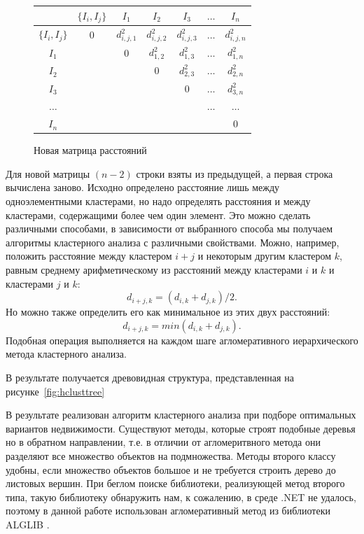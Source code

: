 \documentclass[a4paper,14pt,openany,final]{extreport} %
\def\oldcaption{} \let\oldcaption=\caption
\def\caption{\stepcounter{captionsnum}\oldcaption}
\begin{document}
\begin{figure}[htbp]
  \centering
  \begin{tabular}{|c||c|c|c|c|c|c|}
    \hline
                  & $\{I_i,I_j\}$ & $I_1$         & $I_2$         & $I_3$         & $\ldots$ & $I_n$        \\
    \hline
    \hline
    $\{I_i,I_j\}$ &  0            & $d_{i,j,1}^2$ & $d_{i,j,2}^2$ & $d_{i,j,3}^2$ & $\ldots$ & $d_{i,j,n}^2$  \\
    \hline
    $I_1$ & & 0     & $d_{1,2}^2$ & $d_{1,3}^2$ & $\ldots$ & $d_{1,n}^2$  \\
    \hline
    $I_2$ & &      & 0           & $d_{2,3}^2$ & $\ldots$ & $d_{2,n}^2$  \\
    \hline
    $I_3$ & &      &             & 0           & $\ldots$ & $d_{3,n}^2$  \\
    \hline
 $\ldots$ & &      &             &             & $\ldots$ & $\ldots$ \\
    \hline
    $I_n$ & &      &             &             &          & 0  \\
    \hline
  \end{tabular}
  \caption{Новая матрица расстояний}
  \label{fig:disssimmnew}
\end{figure}
Для новой матрицы $(n-2)$ строки взяты из предыдущей, а первая строка вычислена заново. Исходно определено расстояние лишь между одноэлементными кластерами, но надо определять расстояния и между кластерами, содержащими более чем один элемент. Это можно сделать различными способами, в зависимости от выбранного способа мы получаем алгоритмы кластерного анализа с различными свойствами. Можно, например, положить расстояние между кластером $i + j$ и некоторым другим кластером $k$, равным среднему арифметическому из расстояний между кластерами $i$ и $k$ и кластерами $j$ и $k$:
\[d_{i+j,k}=(d_{i,k}+d_{j,k})/2.\]
Но можно также определить его как минимальное из этих двух расстояний:
\[d_{i+j,k}=min⁡(d_{i,k}+d_{j,k}).\]
Подобная операция выполняется на каждом шаге агломеративного иерархического метода кластерного анализа.

В результате получается древовидная структура, представленная на рисунке~\ref{fig:hclusttree}

В результате реализован алгоритм кластерного анализа при подборе оптимальных вариантов недвижимости. Существуют методы, которые строят подобные деревья но в обратном направлении, т.е. в отличии от агломеритвного метода они разделяют все множество объектов на подмножества.  Методы второго классу удобны, если множество объектов большое и не требуется строить дерево до листовых вершин. При беглом поиске библиотеки, реализующей метод второго типа, такую библиотеку обнаружить нам, к сожалению, в среде .NET не удалось, поэтому в данной работе использован агломеративный метод из библиотеки \textsc{ALGLIB} \cite{alglib}.
\end{document}
